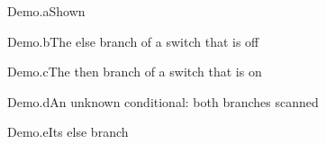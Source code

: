 \documentclass{article}
\newif\ifappendix\appendixfalse
\newif\ifshort\shorttrue
\begin{document}
\begin{leanblock}{Demo.a}{Shown}
\end{leanblock}

\ifappendix

\begin{leanblock}{Demo.hidden}{Switched off}
\end{leanblock}
\else
\begin{leanblock}{Demo.b}{The else branch of a switch that is off}
\end{leanblock}
\fi
\ifshort
\begin{leanblock}{Demo.c}{The then branch of a switch that is on}
\end{leanblock}
\else
\begin{leanblock}{Demo.hidden}{Its else branch}
\end{leanblock}
\fi
\ifx\undefined\relax
\begin{leanblock}{Demo.d}{An unknown conditional: both branches scanned}
\end{leanblock}
\else
\begin{leanblock}{Demo.e}{Its else branch}
\end{leanblock}
\fi
\appendixtrue
\ifappendix

\fi
\ifshort \else\fi
\end{document}
